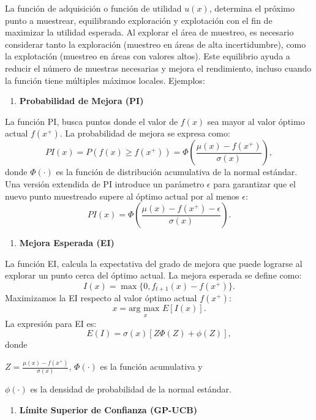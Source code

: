 \documentclass[
  12pt,
  letterpaper,
  DIV=11,
  numbers=noendperiod]{scrartcl}
\providecommand{\tightlist}{%
  \setlength{\itemsep}{0pt}\setlength{\parskip}{0pt}}\usepackage{longtable,booktabs,array}
\begin{document}
La función de adquisición o función de utilidad \(u(x)\), determina el
próximo punto a muestrear, equilibrando exploración y explotación con el
fin de maximizar la utilidad esperada. Al explorar el área de muestreo,
es necesario considerar tanto la exploración (muestreo en áreas de alta
incertidumbre), como la explotación (muestreo en áreas con valores
altos). Este equilibrio ayuda a reducir el número de muestras necesarias
y mejora el rendimiento, incluso cuando la función tiene múltiples
máximos locales. Ejemplos:

\begin{enumerate}
\def\labelenumi{\arabic{enumi}.}
\tightlist
\item
  \textbf{Probabilidad de Mejora (PI)}
\end{enumerate}

La función PI, busca puntos donde el valor de \(f(x)\) sea mayor al
valor óptimo actual \(f(x^+)\). La probabilidad de mejora se expresa
como: \[
PI(x) = P(f(x) \geq f(x^+)) = \Phi\left(\frac{\mu(x) - f(x^+)}{\sigma(x)}\right),
\] donde \(\Phi(\cdot)\) es la función de distribución acumulativa de la
normal estándar. Una versión extendida de PI introduce un parámetro
\(\epsilon\) para garantizar que el nuevo punto muestreado supere al
óptimo actual por al menos \(\epsilon\): \[
PI(x) = \Phi\left(\frac{\mu(x) - f(x^+) - \epsilon}{\sigma(x)}\right).
\]

\begin{enumerate}
\def\labelenumi{\arabic{enumi}.}
\setcounter{enumi}{1}
\tightlist
\item
  \textbf{Mejora Esperada (EI)}
\end{enumerate}

La función EI, calcula la expectativa del grado de mejora que puede
lograrse al explorar un punto cerca del óptimo actual. La mejora
esperada se define como: \[
I(x) = \max\{0, f_{t+1}(x) - f(x^+)\}.
\] Maximizamos la EI respecto al valor óptimo actual \(f(x^+)\): \[
x = \underset{x}{\text{arg max }} E[I(x)].
\] La expresión para EI es: \[
E(I) = \sigma(x) \left[ Z \Phi(Z) + \phi(Z) \right],
\] donde

\(Z = \frac{\mu(x) - f(x^+)}{\sigma(x)}\), \(\Phi(\cdot)\) es la función
acumulativa y

\(\phi(\cdot)\) es la densidad de probabilidad de la normal estándar.

\begin{enumerate}
\def\labelenumi{\arabic{enumi}.}
\setcounter{enumi}{2}
\tightlist
\item
  \textbf{Límite Superior de Confianza (GP-UCB)}
\end{enumerate}
\end{document}
